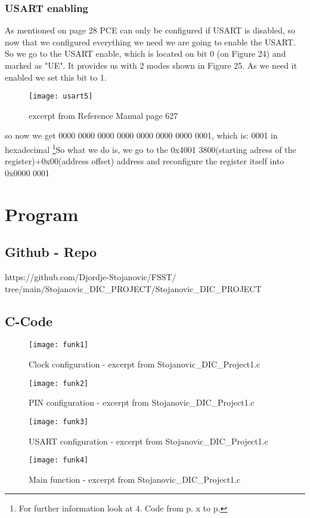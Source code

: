 \documentclass[11pt]{scrartcl}
\begin{document}
	\subsubsection{USART enabling}
As mentioned on page 28 PCE can only be configured if USART is disabled, so now that we configured everything we need we are going to enable the USART.
So we go to the USART enable, which is located on bit 0 (on Figure 24) and marked as "UE". It provides us with 2 modes shown in Figure 25. As we need it enabled we set this bit to 1.
\begin{figure}[h]
		\centering
		\texttt{[image: usart5]}
		\caption{excerpt from Reference Manual page 627}
\end{figure}
\newline
so now we get 0000 0000 0000 0000 0000 0000 0000 0001, which is: 0001 in hexadecimal
\newline\newline
\footnote{\label{foot:24}For further information look at 4. Code from p. x to p.}So what we do is, we go to the 0x4001 3800(starting adress of the register)+0x00(address offset) address and reconfigure the register itself into 0x0000 0001



\newpage
	\section{Program}
	\subsection{Github - Repo}
	https://github.com/Djordje-Stojanovic/FSST/
	\newline tree/main/Stojanovic\_DIC\_PROJECT/Stojanovic\_DIC\_PROJECT
	\subsection{C-Code}
\begin{figure}[h]
		\centering
		\texttt{[image: funk1]}
		\caption{Clock configuration - excerpt from Stojanovic\_DIC\_Project1.c}
\end{figure}
\begin{figure}[h]
		\centering
		\texttt{[image: funk2]}
		\caption{PIN configuration - excerpt from Stojanovic\_DIC\_Project1.c}
\end{figure}
\begin{figure}[h]
		\centering
		\texttt{[image: funk3]}
		\caption{USART configuration - excerpt from Stojanovic\_DIC\_Project1.c}
\end{figure}
\begin{figure}[h]
		\centering
		\texttt{[image: funk4]}
		\caption{Main function - excerpt from Stojanovic\_DIC\_Project1.c}
\end{figure}
	

	
\end{document}

